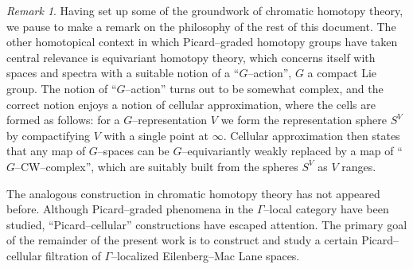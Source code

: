 \documentclass{amsart}
\newcommand{\<}{\langle}
\renewcommand{\>}{\rangle}
\theoremstyle{plain}
\theoremstyle{definition}
\theoremstyle{remark}
\newtheorem*{remark}{Remark}
\begin{document}
\begin{remark}
Having set up some of the groundwork of chromatic homotopy theory, we pause to make a remark on the philosophy of the rest of this document.  The other homotopical context in which Picard--graded homotopy groups have taken central relevance is equivariant homotopy theory, which concerns itself with spaces and spectra with a suitable notion of a ``$G$--action'', $G$ a compact Lie group.  The notion of ``$G$--action'' turns out to be somewhat complex, and the correct notion enjoys a notion of cellular approximation, where the cells are formed as follows: for a $G$--representation $V$ we form the representation sphere $S^V$ by compactifying $V$ with a single point at $\infty$.  Cellular approximation then states that any map of $G$--spaces can be $G$--equivariantly weakly replaced by a map of ``$G$--CW--complex'', which are suitably built from the spheres $S^V$ as $V$ ranges.

The analogous construction in chromatic homotopy theory has not appeared before. Although Picard--graded phenomena in the $\Gamma$--local category have been studied, ``Picard--cellular'' constructions have escaped attention.  The primary goal of the remainder of the present work is to construct and study a certain Picard--cellular filtration of $\Gamma$--localized Eilenberg--Mac Lane spaces.
\end{remark}
\end{document}
